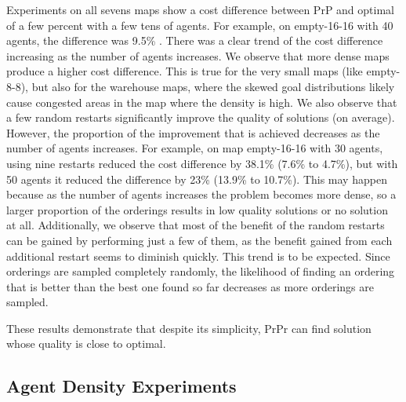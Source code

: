 \documentclass{article}
\newcommand{\benchone}{Benchmark1\xspace}
\newcommand{\benchtwo}{Benchmark2\xspace}
\newcommand{\ad}{Agent Density\xspace}
\begin{document}
Experiments on all sevens maps show a cost difference between PrP and optimal of a few percent with a few tens of agents. For example, on empty-16-16 with 40 agents, the difference was 9.5\% . There was a clear trend of the cost difference increasing as the number of agents increases. We observe that more dense maps produce a higher cost difference. This is true for the very small maps (like empty-8-8), but also for the warehouse maps, where the skewed goal distributions likely cause congested areas in the map where the density is high.
We also observe that a few random restarts significantly improve the quality of solutions (on average). However, the proportion of the improvement that is achieved decreases as the number of agents increases. For example, on map empty-16-16 with 30 agents, using nine restarts reduced the cost difference by 38.1\% (7.6\% to 4.7\%), but with 50 agents it reduced the difference by 23\% (13.9\% to 10.7\%). This may happen because as the number of agents increases
the problem becomes more dense, so a larger proportion of the orderings results in low quality solutions or no solution at all. 
Additionally, we observe that most of the benefit of the random restarts can be gained by performing just a few of them, as the benefit gained from each additional restart seems to diminish quickly. This trend is to be expected. Since orderings are sampled completely randomly, the likelihood of finding an ordering that is better than the best one found so far decreases as more orderings are sampled.


These results demonstrate that despite its simplicity, PrPr can find solution whose quality is close to optimal.

\subsection{\ad Experiments}
\end{document}
